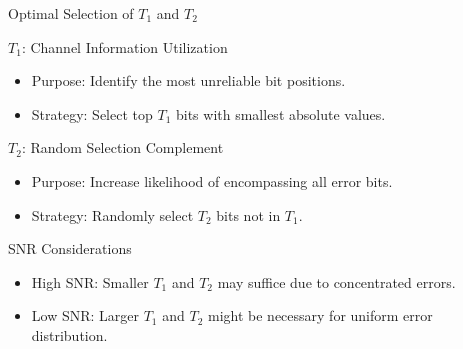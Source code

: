 \documentclass[aspectratio=169,8pt]{beamer}
\begin{document}
\begin{frame}{Optimal Selection of $T_1$ and $T_2$}

  \vspace{-0.2cm}
  \centering
  \begin{minipage}{0.9\textwidth}
  \begin{block}{$T_1$: Channel Information Utilization}
    \begin{itemize}
      \item Purpose: Identify the most unreliable bit positions.
      \item Strategy: Select top $T_1$ bits with smallest absolute values.
    \end{itemize}
  \end{block}

  \begin{block}{$T_2$: Random Selection Complement}
    \begin{itemize}
      \item Purpose: Increase likelihood of encompassing all error bits.
      \item Strategy: Randomly select $T_2$ bits not in $T_1$.
    \end{itemize}
  \end{block}

  \begin{block}{SNR Considerations}
    \begin{itemize}
      \item High SNR: Smaller $T_1$ and $T_2$ may suffice due to concentrated errors.
      \item Low SNR: Larger $T_1$ and $T_2$ might be necessary for uniform error distribution.
    \end{itemize}
  \end{block}

  \end{minipage}
\end{frame}
\end{document}
